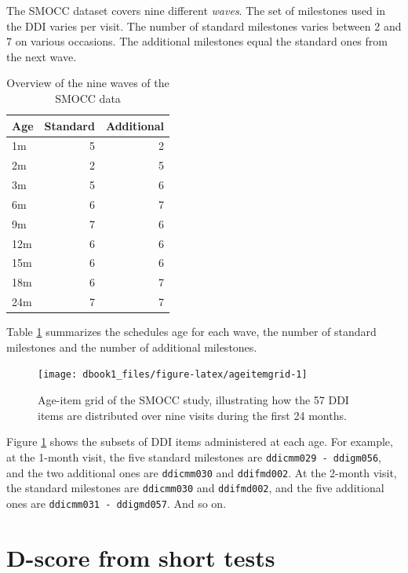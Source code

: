 \documentclass[
]{book}
\begin{document}
The SMOCC dataset covers nine different \emph{waves}. The set of milestones used in the DDI varies per visit. The number of standard milestones varies between 2 and 7 on various occasions. The additional milestones equal the standard ones from the next wave.

\begin{table}

\caption{\label{tab:tableSMOCC}Overview of the nine waves of the SMOCC data}
\centering
\begin{tabular}[t]{lrr}
\toprule
Age & Standard & Additional\\
\midrule
1m & 5 & 2\\
2m & 2 & 5\\
3m & 5 & 6\\
6m & 6 & 7\\
9m & 7 & 6\\
\addlinespace
12m & 6 & 6\\
15m & 6 & 6\\
18m & 6 & 7\\
24m & 7 & 7\\
\bottomrule
\end{tabular}
\end{table}

Table \ref{tab:tableSMOCC} summarizes the schedules age for each wave, the number of standard milestones and the number of additional milestones.

\begin{figure}

{\centering \texttt{[image: dbook1\_files/figure-latex/ageitemgrid-1]} 

}

\caption{Age-item grid of the SMOCC study, illustrating how the 57 DDI items are distributed over nine visits during the first 24 months.}\label{fig:ageitemgrid}
\end{figure}



Figure \ref{fig:ageitemgrid} shows the subsets of DDI items administered at each age. For example, at the 1-month visit, the five standard milestones are \texttt{ddicmm029\ -\ ddigm056}, and the two additional ones are \texttt{ddicmm030} and \texttt{ddifmd002}. At the 2-month visit, the standard milestones are \texttt{ddicmm030} and \texttt{ddifmd002}, and the five additional ones are \texttt{ddicmm031\ -\ ddigmd057}. And so on.

\hypertarget{sec:comparingd}{%
\section{D-score from short tests}\label{sec:comparingd}}
\end{document}
